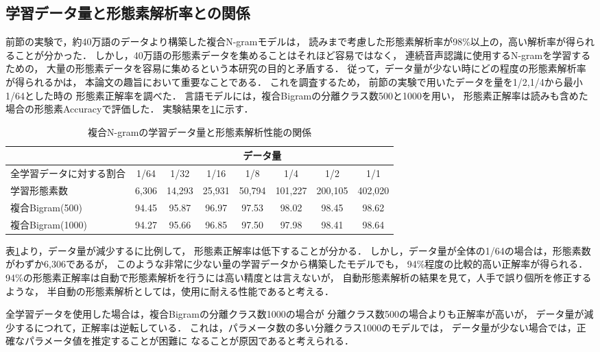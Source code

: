 \subsection{学習データ量と形態素解析率との関係}
前節の実験で，約40万語のデータより構築した複合N-gramモデルは，
読みまで考慮した形態素解析率が98\%以上の，高い解析率が得られることが分かった．
しかし，40万語の形態素データを集めることはそれほど容易ではなく，
連続音声認識に使用するN-gramを学習するための，
大量の形態素データを容易に集めるという本研究の目的と矛盾する．
従って，データ量が少ない時にどの程度の形態素解析率が得られるかは，
本論文の趣旨において重要なことである．
これを調査するため，
前節の実験で用いたデータを量を1/2,1/4から最小1/64とした時の
形態素正解率を調べた．
言語モデルには，複合Bigramの分離クラス数500と1000を用い，
形態素正解率は読みも含めた場合の形態素Accuracyで評価した．
実験結果を\ref{tbl:DataAmount}に示す．

\begin{table}[tb]
\begin{center}
  \caption{複合N-gramの学習データ量と形態素解析性能の関係}
  \label{tbl:DataAmount}
  \begin{tabular}{|l||c|c|c|c|c|c|c|}
    \hline
     &  \multicolumn{7}{c|}{データ量} \\ \hline
 全学習データに対する割合 &  1/64 &  1/32 &  1/16 &  1/8  & 1/4 & 1/2 & 1/1 \\ \hline
    学習形態素数 &  6,306& 14,293& 25,931& 50,794&101,227&200,105&402,020 \\ \hline \hline
複合Bigram(500)  & 94.45 & 95.87 & 96.97 & 97.53 & 98.02 & 98.45 & 98.62 \\ \hline
複合Bigram(1000) & 94.27 & 95.66 & 96.85 & 97.50 & 97.98 & 98.41 & 98.64 \\ \hline
  \end{tabular}
\end{center}
\end{table}

表\ref{tbl:DataAmount}より，データ量が減少するに比例して，
形態素正解率は低下することが分かる．
しかし，データ量が全体の1/64の場合は，形態素数がわずか6,306であるが，
このような非常に少ない量の学習データから構築したモデルでも，
94\%程度の比較的高い正解率が得られる．
94\%の形態素正解率は自動で形態素解析を行うには高い精度とは言えないが，
自動形態素解析の結果を見て，人手で誤り個所を修正するような，
半自動の形態素解析としては，使用に耐える性能であると考える．

全学習データを使用した場合は，複合Bigramの分離クラス数1000の場合が
分離クラス数500の場合よりも正解率が高いが，
データ量が減少するにつれて，正解率は逆転している．
これは，パラメータ数の多い分離クラス1000のモデルでは，
データ量が少ない場合では，正確なパラメータ値を推定することが困難に
なることが原因であると考えられる．


